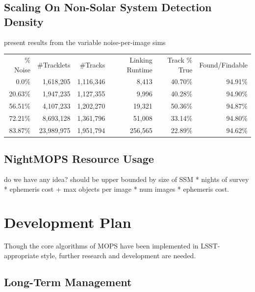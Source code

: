 \documentclass[12pt,preprint]{aastex}
\begin{document}
\subsection{Scaling On Non-Solar System Detection Density}

present results from the variable noise-per-image sims

\begin{tabular}{|r|r|r|r|r|r|}
  \hline 
  \% Noise & \#Tracklets & \#Tracks  & Linking Runtime & Track \% True & Found/Findable \\
  0.0\%    &  1,618,205  & 1,116,346 & 8,413           &  40.70\%      &  94.91\%       \\
  20.63\%  & 1,947,235   & 1,127,355 & 9,996           & 40.28\%       &  94.90\%       \\
  56.51\%  & 4,107,233   & 1,202,270 & 19,321          & 50.36\%       &  94.87\%       \\
  72.21\%  & 8,693,128   & 1,361,796 & 51,008          & 33.14\%       &  94.80\%       \\
  83.87\%  & 23,989,975  & 1,951,794 & 256,565         & 22.89\%       &  94.62\%       \\
  \hline
\end{tabular}



\subsection{NightMOPS Resource Usage}

do we have any idea?  should be upper bounded by size of SSM * nights
of survey * ephemeris cost + max objects per image * num images *
ephemeris cost.
















\section{Development Plan}

Though the core algorithms of MOPS have been implemented in
LSST-appropriate style, further research and development are needed.



\subsection{Long-Term Management}
\end{document}
